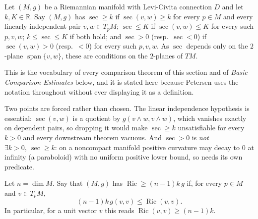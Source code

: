 \begin{definition}
  \label{def:pet-ch6-sec-bounds}
  \leanok
  Let $(M,g)$ be a Riemannian manifold with Levi-Civita connection $D$ and let
  $k,K\in\mathbb{R}$. Say $(M,g)$ has $\sec\ge k$ if $\sec(v,w)\ge k$ for every
  $p\in M$ and every linearly independent pair $v,w\in T_pM$; $\sec\le K$ if
  $\sec(v,w)\le K$ for every such $p,v,w$; $k\le\sec\le K$ if both hold; and
  $\sec>0$ (resp.\ $\sec<0$) if $\sec(v,w)>0$ (resp.\ $<0$) for every such
  $p,v,w$. As $\sec$ depends only on the $2$-plane $\operatorname{span}\{v,w\}$,
  these are conditions on the $2$-planes of $TM$.

  This is the vocabulary of every comparison theorem of this section and of
  \emph{Basic Comparison Estimates} below, and it is stated here because
  Petersen uses the notation throughout without ever displaying it as a
  definition.

  Two points are forced rather than chosen. The linear independence hypothesis
  is essential: $\sec(v,w)$ is a quotient by $g(v\wedge w,v\wedge w)$, which
  vanishes exactly on dependent pairs, so dropping it would make $\sec\ge k$
  unsatisfiable for every $k>0$ and every downstream theorem vacuous. And
  $\sec>0$ is \emph{not} $\exists k>0,\ \sec\ge k$: on a noncompact manifold
  positive curvature may decay to $0$ at infinity (a paraboloid) with no uniform
  positive lower bound, so  needs its own
  predicate.
\end{definition}

\begin{definition}
  \label{def:pet-ch6-ricci-lower-bound}
  \leanok
  Let $n=\dim M$.  Say that $(M,g)$ has
  $\operatorname{Ric}\ge(n-1)k\,g$ if, for every $p\in M$ and $v\in T_pM$,
  \[
    (n-1)k\,g(v,v)\le \operatorname{Ric}(v,v).
  \]
  In particular, for a unit vector $v$ this reads
  $\operatorname{Ric}(v,v)\ge(n-1)k$.
\end{definition}

